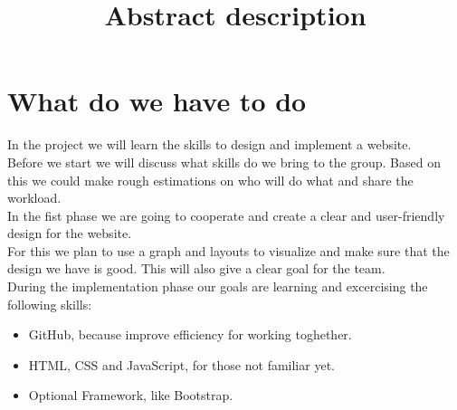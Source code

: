 \documentclass[a4paper,10pt]{article}
\title{Abstract description}
\begin{document}
\maketitle
\section*{What do we have to do}
In the project we will learn the skills to design and implement a website.\\
Before we start we will discuss what skills do we bring to the group. Based on this we could make rough estimations on who will do what and share the workload.\\ 
In the fist phase we are going to cooperate and create a clear and user-friendly design for the website.\\
For this we plan to use a graph and layouts to visualize and make sure that the design we have is good. This will also give a clear goal for the team.\\
During the implementation phase our goals are learning and excercising the following skills:\\
\begin{itemize}
  \item GitHub, because improve efficiency for working toghether.
  \item HTML, CSS and JavaScript, for those not familiar yet.
  \item Optional Framework, like Bootstrap.
\end{itemize}
\end{document}
